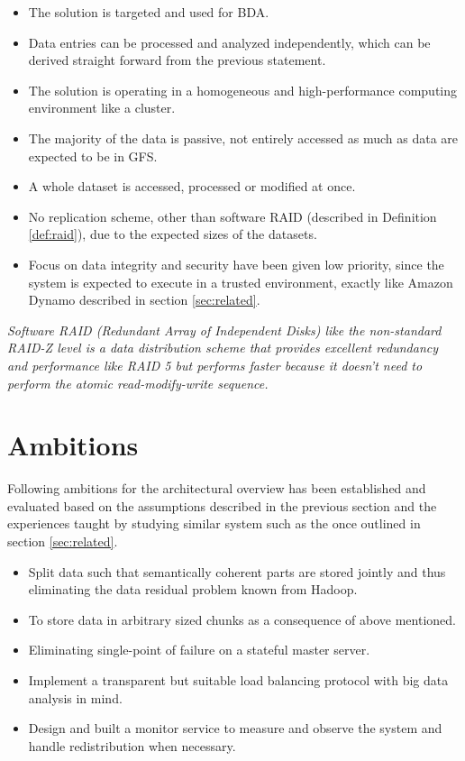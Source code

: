 \vspace*{3mm}
\begin{itemize}
	\item The solution is targeted and used for BDA.
	\item Data entries can be processed and analyzed independently, which can be derived straight forward from the previous statement.
	\item The solution is operating in a homogeneous and high-performance computing environment like a cluster.
	\item The majority of the data is passive, \eg not entirely accessed as much as data are expected to be in GFS.
	\item A whole dataset is accessed, processed or modified at once.
	\item No replication scheme, other than software RAID (described in Definition \ref{def:raid}), due to the expected sizes of the datasets.
	\item Focus on data integrity and security have been given low priority, since the system is expected to execute in a trusted environment, exactly like Amazon Dynamo described in section \ref{sec:related}.
\end{itemize}
\vspace*{3mm}

\begin{definition}[RAID] \label{def:raid}
\textit{Software RAID (Redundant Array of Independent Disks) like the non-standard RAID-Z level is a data distribution scheme that provides excellent redundancy and performance like RAID 5 but performs faster because it doesn't need to perform the atomic read-modify-write sequence.}
\end{definition}

\section{Ambitions} \label{sec:ambitions}
Following ambitions for the architectural overview has been established and evaluated based on the assumptions described in the previous section and the experiences taught by studying similar system such as the once outlined in section \ref{sec:related}.

\vspace*{3mm}
\begin{itemize}
	\item Split data such that semantically coherent parts are stored jointly and thus eliminating the data residual problem known from Hadoop.
	\item To store data in arbitrary sized chunks as a consequence of above mentioned.
	\item Eliminating single-point of failure on a stateful master server.
	\item Implement a transparent but suitable load balancing protocol with big data analysis in mind.
	\item Design and built a monitor service to measure and observe the system and handle redistribution when necessary.
\end{itemize}
\vspace*{3mm}

